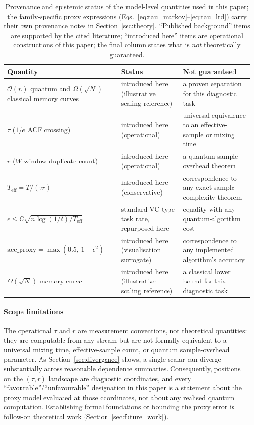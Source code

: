 \documentclass[sensors,article,submit,pdftex,moreauthors]{Definitions/mdpi}
\newcommand{\bigO}{\mathcal{O}}
\newcommand{\Teff}{T_{\mathrm{eff}}}
\begin{document}
\begin{table}[t]
\centering
\caption{Provenance and epistemic status of the model-level quantities used in this paper; the family-specific proxy expressions (Eqs.~\eqref{eq:tau_markov}--\eqref{eq:tau_lrd}) carry their own provenance notes in Section~\ref{sec:theory}. ``Published background'' items are supported by the cited literature; ``introduced here'' items are operational constructions of this paper; the final column states what is \emph{not} theoretically guaranteed.}
\label{tab:provenance}
\begin{tabularx}{\textwidth}{@{}p{5.1cm}p{3.6cm}X@{}}
\toprule
Quantity & Status & Not guaranteed \\
\midrule
$\bigO(n)$ quantum and $\Omega(\sqrt{N})$ classical memory curves & introduced here (illustrative scaling reference) & a proven separation for this diagnostic task \\
$\tau$ ($1/e$ ACF crossing) & introduced here (operational) & universal equivalence to an effective-sample or mixing time \\
$r$ ($W$-window duplicate count) & introduced here (operational) & a quantum sample-overhead theorem \\
$\Teff = T/(\tau r)$ & introduced here (conservative) & correspondence to any exact sample-complexity theorem \\
$\epsilon \leq C\sqrt{n \log(1/\delta)/\Teff}$ & standard VC-type task rate, repurposed here & equality with any quantum-algorithm cost \\
$\mathrm{acc\_proxy} = \max(0.5,\, 1 - \epsilon^2)$ & introduced here (visualisation surrogate) & correspondence to any implemented algorithm's accuracy \\
$\Omega(\sqrt{N})$ memory curve & introduced here (illustrative scaling reference) & a classical lower bound for this diagnostic task \\
\bottomrule
\end{tabularx}
\end{table}

\paragraph{Scope limitations} The operational $\tau$ and $r$ are measurement conventions, not theoretical quantities: they are computable from any stream but are not formally equivalent to a universal mixing time, effective-sample count, or quantum sample-overhead parameter. As Section~\ref{sec:divergence} shows, a single scalar can diverge substantially across reasonable dependence summaries. Consequently, positions on the $(\tau, r)$ landscape are diagnostic coordinates, and every ``favourable''/``unfavourable'' designation in this paper is a statement about the proxy model evaluated at those coordinates, not about any realised quantum computation. Establishing formal foundations or bounding the proxy error is follow-on theoretical work (Section~\ref{sec:future_work}).
\end{document}
